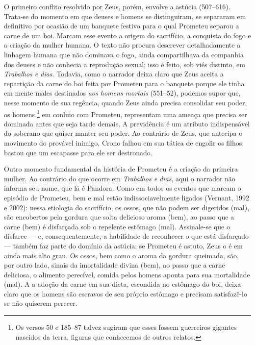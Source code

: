 O primeiro conflito resolvido por Zeus, porém, envolve a astúcia
(507--616). Trata-se do momento em que deuses e homens se distinguiram,
se separaram em definitivo por ocasião de um banquete festivo para o
qual Prometeu separou a carne de um boi. Marcam esse evento a origem do
sacrifício, a conquista do fogo e a criação da mulher humana. O texto
não procura descrever detalhadamente a linhagem humana que não dominava
o fogo, ainda compartilhava da companhia dos deuses e não conhecia a
reprodução sexual; isso é feito, sob viés distinto, em \textit{Trabalhos e
dias}. Todavia, como o narrador deixa claro que Zeus aceita a repartição
da carne do boi feita por Prometeu para o banquete porque ele tinha em
mente males destinados \textit{aos homens mortais} (551--52), podemos supor
que, nesse momento de sua regência, quando Zeus ainda precisa consolidar
seu poder, os homens,\footnote{Os versos 50 e 185--87 talvez sugiram que esses
fossem guerreiros gigantes nascidos da terra, figuras que conhecemos de
outros relatos.} em conluio com Prometeu, representam uma ameaça que
precisa ser dominada antes que seja tarde demais. A previdência é um
atributo indispensável do soberano que quiser manter seu poder. Ao
contrário de Zeus, que antecipa o movimento do provável inimigo, Crono
falhou em sua tática de engolir os filhos: bastou que um escapasse para
ele ser destronado.

Outro momento fundamental da história de Prometeu é a criação da
primeira mulher. Ao contrário do que ocorre em \textit{Trabalhos e dias},
aqui o narrador não informa seu nome, que lá é Pandora. Como em todos os
eventos que marcam o episódio de Prometeu, bem e mal estão
indissociavelmente ligados (Vernant, 1992 e 2002): nessa etiologia do
sacrifício, os ossos, que não podem ser digeridos (mal), são encobertos
pela gordura que solta delicioso aroma (bem), ao passo que a carne (bem)
é disfarçada sob o repelente estômago (mal). Assinale-se que o disfarce
--- e, consequentemente, a habilidade de reconhecer o que está disfarçado
--- também faz parte do domínio da astúcia: se Prometeu é astuto, Zeus o
é em ainda mais alto grau. Os ossos, bem como o aroma da gordura
queimada, são, por outro lado, sinais da imortalidade divina (bem), ao
passo que a carne deliciosa, o alimento perecível, comida pelos homens
aponta para sua mortalidade (mal). A a adoção da carne em sua dieta,
escondida no estômago do boi, deixa claro que os homens são escravos de
seu próprio estômago e precisam satisfazê-lo se não quiserem perecer.


